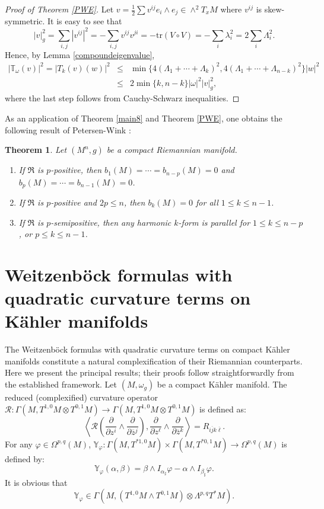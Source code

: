 \documentclass[12pt, reqno]{amsart}
\theoremstyle{plain}
\newtheorem{thm}{Theorem}[section]
\theoremstyle{definition}
\newcommand{\btheorem}{\begin{thm}}
\newcommand{\etheorem}{\end{thm}}
\newcommand{\bproof}{\begin{proof}}
\newcommand{\eproof}{\end{proof}}
\newcommand{\p}{\partial}
\renewcommand{\bar}{\overline}
\renewcommand{\phi}{\varphi}
\newcommand{\beq}{\begin{equation}}
\newcommand{\eeq}{\end{equation}}
\newcommand{\ee}{\end{eqnarray*}}
\newcommand{\be}{\begin{eqnarray*}}
\newcommand{\bd}{\begin{enumerate}}
\newcommand{\ed}{\end{enumerate}}
\renewcommand{\>}{\rightarrow}
\renewcommand{\#}{\sharp}
\numberwithin{equation}{section} %
\begin{document}
\bproof[Proof of Theorem \ref{PWE}]  Let $v=\frac{1}{2}\sum v^{ij} e_i\wedge e_j\in\wedge^2 T_xM$ where $v^{ij}$ is skew-symmetric.
It is easy to see that
\beq |v|^2_g=\sum_{i,j} |v^{ij}|^2=-\sum_{i,j}v^{ij}v^{ji}=- \mathrm{tr}\left(V\circ V\right)=-\sum_i \lambda_i^2=2\sum_{i}\Lambda_i^2.\eeq
Hence, by Lemma \ref{compoundeigenvalue},
\be   |\mathbb T_\omega(v)|^2=|T_k(v)(w)|^2&\leq& \min\{4\left(\Lambda_1+\cdots +\Lambda_k\right)^2, 4\left(\Lambda_1+\cdots +\Lambda_{n-k}\right)^2 \} |w|^2\\ &\leq&2\min\{k,n-k\}  |\omega|^2 |v|_g^2,\ee
where the last step follows from  Cauchy-Schwarz inequalities.
\eproof


\noindent As an application of Theorem \ref{main8} and Theorem \ref{PWE}, one obtains
the following result of  Petersen-Wink \cite{PetersenWink2021a}:
\btheorem Let $(M^n,g)$ be a compact   Riemannian manifold. \bd

\item If $ \mathfrak{R} $ is $ p $-positive, then $ b_1(M) = \cdots = b_{n-p}(M) = 0$ and $b_p(M) = \cdots= b_{n-1}(M) = 0 $.

\item If $\mathfrak{R} $ is $ p $-positive and $ 2p \leq n $, then $ b_k(M) = 0 $ for all $ 1 \leq k \leq n - 1$.


\item If  $ \mathfrak{R} $ is $p$-semipositive, then any harmonic $k$-form is parallel for $ 1 \leq k \leq n - p $, or $ p \leq k \leq n-1 $.

\ed
\etheorem


\baselineskip


\section{Weitzenb\"ock formulas with quadratic curvature terms on K\"ahler manifolds}\label{sectionWK}


The Weitzenb\"ock formulas with quadratic curvature terms on compact K\"ahler manifolds constitute a natural complexification of their Riemannian counterparts. Here we present the principal results; their proofs follow straightforwardly from the established framework. Let $(M,\omega_g) $ be a compact K\"ahler manifold. The reduced (complexified)  curvature operator $ \mathscr{R}: \Gamma(M,T^{1,0}M \otimes T^{0,1}M) \> \Gamma(M,T^{1,0}M \otimes T^{0,1}M)$ is
defined as:
\beq \left\langle \mathscr{R}\left(\frac{\p}{\p z^i} \wedge \frac{\p}{\p \bar z{}^j}\right), \frac{\p}{\p z^\ell} \wedge \frac{\p}{\p \bar z{}^k}\right\rangle = R_{i\bar j k\bar\ell}. \eeq
For any $ \phi \in \Omega^{p,q}(M) $, $ \mathbb{Y}_\phi: \Gamma(M,T^{*1,0}M) \times \Gamma(M,T^{*0,1}M) \> \Omega^{p,q}(M) $ is defined
by:
\beq \mathbb{Y}_\phi(\alpha,\beta) = \beta \wedge I_{\alpha_\#} \phi - \alpha \wedge I_{\beta_\#} \phi. \eeq
 It is obvious that
\beq  \mathbb{Y}_\phi \in \Gamma\left(M,\left(T^{1,0}M \wedge T^{0,1}M\right) \otimes \Lambda^{p,q}T^*M\right). \eeq
\end{document}
